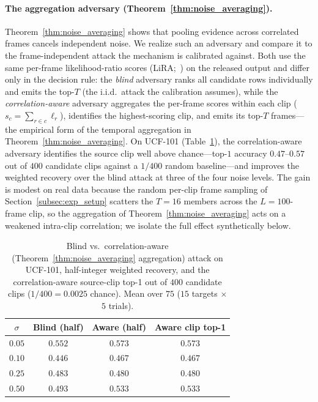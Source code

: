 \documentclass[letterpaper]{article} %
\begin{document}
\paragraph{The aggregation adversary (Theorem~\ref{thm:noise_averaging}).}
Theorem~\ref{thm:noise_averaging} shows that pooling evidence across
correlated frames cancels independent noise. We realize such an adversary
and compare it to the frame-independent attack the mechanism is calibrated
against. Both use the same per-frame likelihood-ratio scores
(LiRA;~\citealp{carlini2022firstprinciples}) on the released output and
differ only in the decision rule: the \emph{blind} adversary ranks all
candidate rows individually and emits the top-$T$ (the i.i.d.\ attack the
calibration assumes), while the \emph{correlation-aware} adversary
aggregates the per-frame scores within each clip
($s_c = \sum_{r \in c} \ell_r$), identifies the highest-scoring clip, and
emits its top-$T$ frames---the empirical form of the temporal aggregation
in Theorem~\ref{thm:noise_averaging}. On UCF-101
(Table~\ref{tab:aggregation}), the correlation-aware adversary identifies
the source clip well above chance---top-$1$ accuracy $0.47$--$0.57$ out of
$400$ candidate clips against a $1/400$ random baseline---and improves the
weighted recovery over the blind attack at three of the four noise levels.
The gain is modest on real data because the random per-clip frame sampling
of Section~\ref{subsec:exp_setup} scatters the $T=16$ members across the
$L=100$-frame clip, so the aggregation of
Theorem~\ref{thm:noise_averaging} acts on a weakened intra-clip
correlation; we isolate the full effect synthetically below.

\begin{table}[t]
\centering\small
\caption{Blind vs.\ correlation-aware (Theorem~\ref{thm:noise_averaging}
aggregation) attack on UCF-101, half-integer weighted recovery, and the
correlation-aware source-clip top-1 out of $400$ candidate clips
($1/400 = 0.0025$ chance). Mean over $75$ ($15$ targets $\times$ $5$
trials).}
\label{tab:aggregation}
\begin{tabular}{cccc}
\toprule
$\sigma$ & Blind (half) & Aware (half) & Aware clip top-1 \\
\midrule
$0.05$ & $0.552$ & $0.573$ & $0.573$ \\
$0.10$ & $0.446$ & $0.467$ & $0.467$ \\
$0.25$ & $0.483$ & $0.480$ & $0.480$ \\
$0.50$ & $0.493$ & $0.533$ & $0.533$ \\
\bottomrule
\end{tabular}
\end{table}
\end{document}
